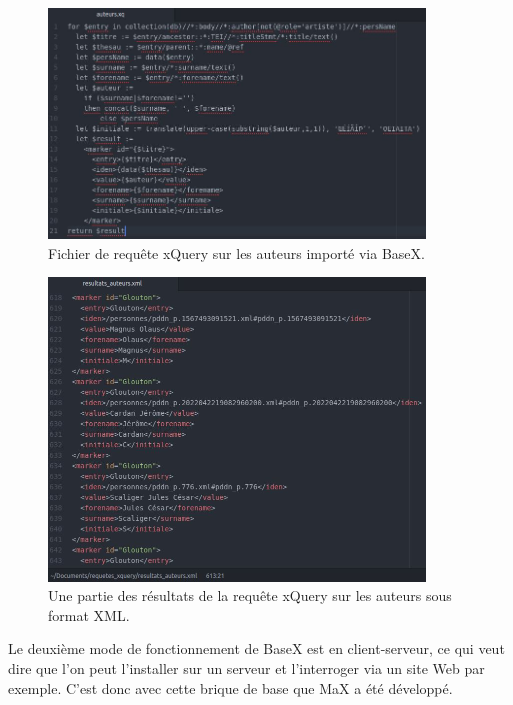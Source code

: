 \documentclass[a4paper,12pt,twoside]{book}
\begin{document}
    \begin{figure}[H]
        \centering
        \includegraphics[width=10cm]{img/partie_1/auteurs_requete_xq.JPG}
        \caption{Fichier de requête xQuery sur les auteurs importé via BaseX.}
        \label{xq-auteurs}
    \end{figure}
    
    \begin{figure}[H]
        \centering
        \includegraphics[width=10cm]{img/partie_1/resultats_auteurs_xml.JPG}
        \caption{Une partie des résultats de la requête xQuery sur les auteurs sous format XML.}
        \label{xml-auteurs}
    \end{figure}

    
    Le deuxième mode de fonctionnement de BaseX est en client-serveur, ce qui veut dire que l'on peut l'installer sur un serveur et l'interroger via un site Web par exemple. C'est donc avec cette brique de base que MaX a été développé.
\end{document}
